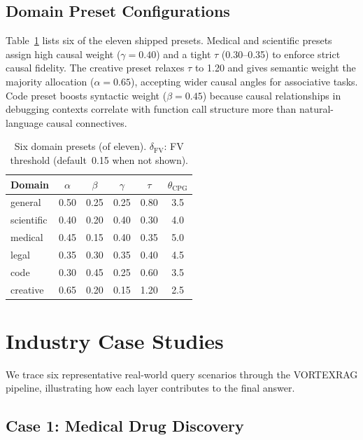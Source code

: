 \documentclass[10pt,twocolumn]{article}
\newcommand{\secvspace}{\vspace{-4pt}}
\begin{document}
\subsection{Domain Preset Configurations}

Table~\ref{tab:presets} lists six of the eleven shipped presets.  Medical and
scientific presets assign high causal weight ($\gamma=0.40$) and a tight $\tau$
(0.30--0.35) to enforce strict causal fidelity.  The creative preset relaxes
$\tau$ to 1.20 and gives semantic weight the majority allocation ($\alpha=0.65$),
accepting wider causal angles for associative tasks.  Code preset boosts
syntactic weight ($\beta=0.45$) because causal relationships in debugging
contexts correlate with function call structure more than natural-language
causal connectives.

\begin{table}[h]
\centering
\caption{Six domain presets (of eleven).  $\delta_\text{FV}$: FV threshold
(default~0.15 when not shown).}
\label{tab:presets}
\footnotesize
\setlength{\tabcolsep}{3.5pt}
\begin{tabular}{@{}lccccc@{}}
\toprule
\textbf{Domain} & $\alpha$ & $\beta$ & $\gamma$ & $\tau$ & $\theta_\text{CPG}$ \\
\midrule
general    & 0.50 & 0.25 & 0.25 & 0.80 & 3.5 \\
scientific & 0.40 & 0.20 & 0.40 & 0.30 & 4.0 \\
medical    & 0.45 & 0.15 & 0.40 & 0.35 & 5.0 \\
legal      & 0.35 & 0.30 & 0.35 & 0.40 & 4.5 \\
code       & 0.30 & 0.45 & 0.25 & 0.60 & 3.5 \\
creative   & 0.65 & 0.20 & 0.15 & 1.20 & 2.5 \\
\bottomrule
\end{tabular}
\end{table}

\section{Industry Case Studies}\label{sec:cases}
\secvspace

We trace six representative real-world query scenarios through the VORTEXRAG
pipeline, illustrating how each layer contributes to the final answer.

\subsection{Case 1: Medical Drug Discovery}
\end{document}
